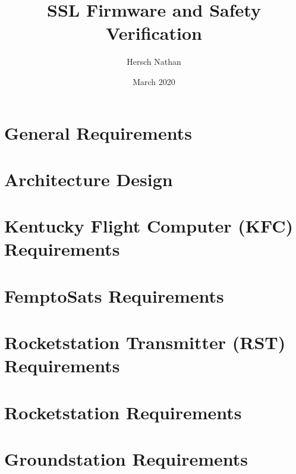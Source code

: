 \documentclass{article}
\title{SSL Firmware and Safety Verification}
\author{Hersch Nathan}
\date{March 2020}
\begin{document}
\maketitle

\section{General Requirements}

\section{Architecture Design}

\section{Kentucky Flight Computer (KFC) Requirements}

\section{FemptoSats Requirements}

\section{Rocketstation Transmitter (RST) Requirements}

\section{Rocketstation Requirements}

\section{Groundstation Requirements}





%

%
%
\end{document}
